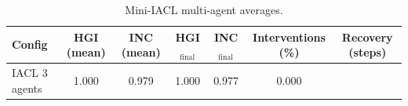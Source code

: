 \begin{table}[H]
\centering
\caption{Mini-IACL multi-agent averages.}
\label{tab:mini_iacl}
\begin{tabular}{lcccccc}
\toprule
Config & HGI (mean) & INC (mean) & HGI$_{\text{final}}$ & INC$_{\text{final}}$ & Interventions (\%) & Recovery (steps) \\
\midrule
 IACL 3 agents & 1.000 & 0.979 & 1.000 & 0.977 & 0.000 &  \\
\bottomrule
\end{tabular}
\end{table}